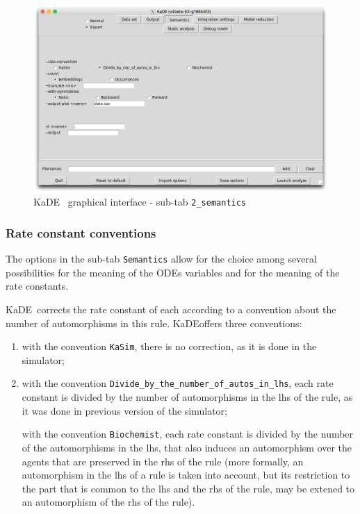 \documentclass[11pt]{book}
\def\KaDE{\textsf{KaDE}}
\begin{document}
\begin{figure}[htbp]
\centering
\includegraphics[width=12cm,bb=0 0 1904 1208]{img/kade_2.png}
\caption{\KaDE~ graphical interface - sub-tab \texttt{2\_semantics}}
\label{fig:kade:2}
\end{figure}

\subsubsection{Rate constant conventions}





The options in the sub-tab \texttt{Semantics} allow for the choice among several possibilities for the meaning of the ODEs variables and for the meaning of the rate constants.


 \KaDE~corrects the rate constant of each  according to a convention about the number of automorphisms in this rule. \KaDE offers three conventions:
\begin{enumerate}
  \item with the convention \texttt{KaSim}, there is no correction, as it is done in the simulator;
  \item with the convention \texttt{Divide\_by\_the\_number\_of\_autos\_in\_lhs}, each rate constant is divided by the number of automorphisms in the lhs of the rule, as it was done in previous version of the simulator;

  with the convention \texttt{Biochemist}, each rate constant is divided
  by the number of the automorphisms in the lhs, that also induces an automorphism over the agents that are preserved in the rhs of the rule (more formally, an automorphism in the lhs of a rule is taken into account, but its restriction to the part that is common to the lhs and the rhs of the rule, may be extened to an automorphism of the rhs of the rule).
\end{enumerate}
\end{document}
